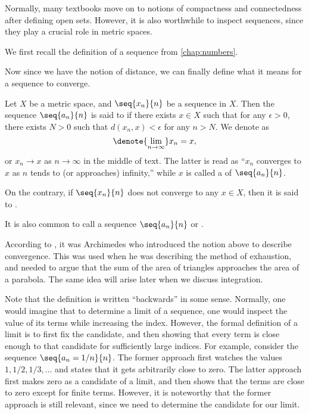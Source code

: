 \label{sec:mseq}

Normally, many textbooks move on to
notions of compactness and connectedness
after defining open sets.
However, it is also worthwhile to inspect sequences,
since they play a crucial role in metric spaces.

We first recall the definition of a sequence from
\cref{chap:numbers}.


Now since we have the notion of distance,
we can finally define what it means for a sequence to converge.

\begin{definition}
    \label{def:convseq}
    Let \(X\) be a metric space,
    and \(\seq{x_n}{n}\) be a sequence in \(X\).
    Then the sequence \(\seq{a_n}{n}\) is said to
    if there exists \(x\in X\) such that
    for any \(\epsilon>0\), there exists \(N>0\) such that
    \(d(x_n,x)<\epsilon\) for any \(n>N\).
    We denote as
    \[
        \denote{\lim_{n\to\infty}}x_n=x,
    \]
    or \(x_n\to x\) as \(n\to\infty\) in the middle of text.
    The latter is read as
    ``\(x_n\) converges to \(x\)
    as \(n\) tends to (or approaches) infinity,''
    while \(x\) is called
    a  of \(\seq{a_n}{n}\).
    
    On the contrary,
    if \(\seq{x_n}{n}\) does not converge to any \(x\in X\),
    then it is said to
    .
\end{definition}

It is also common to call a sequence \(\seq{a_n}{n}\)
 or .

According to \textcite{Bre07},
it was Archimedes who introduced the notion above
to describe convergence.
This was used when he was describing the method of exhaustion,
and needed to argue that
the sum of the area of triangles approaches the area of a parabola.
The same idea will arise later when we discuss integration.

Note that the definition is written ``backwards'' in some sense.
Normally, one would imagine that to determine a limit of a sequence,
one would inspect the value of its terms while increasing the index.
However, the formal definition of a limit is to
first fix the candidate,
and then showing that every term is close enough to that candidate
for sufficiently large indices.
For example, consider the sequence \(\seq{a_n=1/n}{n}\).
The former approach first watches the values \(1,1/2,1/3,\dots\)
and states that it gets arbitrarily close to zero.
The latter approach first makes zero as a candidate of a limit,
and then shows that the terms are close to zero except for finite terms.
However, it is noteworthy that the former approach is still relevant,
since we need to determine the candidate for our limit.

